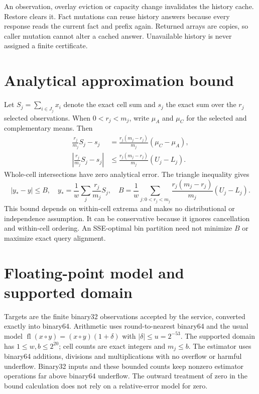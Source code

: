 \documentclass[10pt]{article}
\newcommand{\fl}{\operatorname{fl}}
\begin{document}
An observation, overlay eviction or capacity change invalidates the history cache. Restore clears it. Fact mutations can reuse history answers because every response reads the current fact and prefix again. Returned arrays are copies, so caller mutation cannot alter a cached answer. Unavailable history is never assigned a finite certificate.

\section{Analytical approximation bound}
Let $S_j=\sum_{i\in J_j}x_i$ denote the exact cell sum and $s_j$ the exact sum over the $r_j$ selected observations. When $0<r_j<m_j$, write $\mu_A$ and $\mu_C$ for the selected and complementary means. Then
\begin{align}
\frac{r_j}{m_j}S_j-s_j
 &=\frac{r_j(m_j-r_j)}{m_j}(\mu_C-\mu_A),\\
\left|\frac{r_j}{m_j}S_j-s_j\right|
 &\leq\frac{r_j(m_j-r_j)}{m_j}(U_j-L_j).
\end{align}
Whole-cell intersections have zero analytical error. The triangle inequality gives
\begin{equation}
 |y_* - y|\leq B,
 \quad y_* = \frac1w\sum_j\frac{r_j}{m_j}S_j,
 \quad B=\frac1w\sum_{j:0<r_j<m_j}\frac{r_j(m_j-r_j)}{m_j}(U_j-L_j).
 \label{eq:analytical}
\end{equation}
This bound depends on within-cell extrema and makes no distributional or independence assumption. It can be conservative because it ignores cancellation and within-cell ordering. An SSE-optimal bin partition need not minimize $B$ or maximize exact query alignment.

\section{Floating-point model and supported domain}
Targets are the finite binary32 observations accepted by the service, converted exactly into binary64. Arithmetic uses round-to-nearest binary64 and the usual model $\fl(x\circ y)=(x\circ y)(1+\delta)$ with $|\delta|\leq u=2^{-53}$. The supported domain has $1\leq w,b\leq2^{20}$; cell counts are exact integers and $m_j\leq b$. The estimator uses binary64 additions, divisions and multiplications with no overflow or harmful underflow. Binary32 inputs and these bounded counts keep nonzero estimator operations far above binary64 underflow. The outward treatment of zero in the bound calculation does not rely on a relative-error model for zero.
\end{document}
